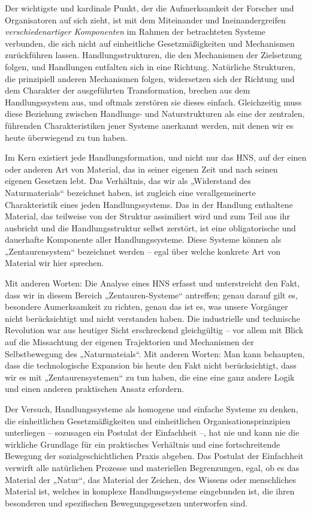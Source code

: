 \documentclass[11pt,a4paper]{article}
\begin{document}
Der wichtigste und kardinale Punkt, der die Aufmerksamkeit der Forscher und
Organisatoren auf sich zieht, ist mit dem Miteinander und Ineinandergreifen
\emph{verschiedenartiger Komponenten} im Rahmen der betrachteten Systeme
verbunden, die sich nicht auf einheitliche Gesetzmäßigkeiten und Mechanismen
zurückführen lassen. Handlungsstrukturen, die den Mechanismen der Zielsetzung
folgen, und Handlungen entfalten sich in eine Richtung. Natürliche Strukturen,
die prinzipiell anderen Mechanismen folgen, widersetzen sich der Richtung und
dem Charakter der ausgeführten Transformation, brechen aus dem Handlungssystem
aus, und oftmals zerstören sie dieses einfach. Gleichzeitig muss diese
Beziehung zwischen Handlungs- und Naturstrukturen als eine der zentralen,
führenden Charakteristiken jener Systeme anerkannt werden, mit denen wir es
heute überwiegend zu tun haben.

Im Kern existiert jede Handlungsformation, und nicht nur das HNS, auf der
einen oder anderen Art von Material, das in seiner eigenen Zeit und nach
seinen eigenen Gesetzen lebt. Das Verhältnis, das wir als „Widerstand des
Naturmaterials“ bezeichnet haben, ist zugleich eine verallgemeinerte
Charakteristik eines jeden Handlungssystems.  Das in der Handlung enthaltene
Material, das teilweise von der Struktur assimiliert wird und zum Teil aus ihr
ausbricht und die Handlungsstruktur selbst zerstört, ist eine obligatorische
und dauerhafte Komponente aller Handlungssysteme. Diese Systeme können als
„Zentaurensystem“ bezeichnet werden -- egal über welche konkrete Art von
Material wir hier sprechen.

Mit anderen Worten: Die Analyse eines HNS erfasst und unterstreicht den Fakt,
dass wir in diesem Bereich „Zentauren-Systeme“ antreffen; genau darauf gilt es,
besondere Aumerksamkeit zu richten, genau das ist es, was unsere Vorgänger
nicht berücksichtigt und nicht verstanden haben.  Die industrielle und
technische Revolution war aus heutiger Sicht erschreckend gleichgültig -- vor
allem mit Blick auf die Missachtung der eigenen Trajektorien und Mechanismen
der Selbstbewegung des „Naturmateials“.  Mit anderen Worten: Man kann
behaupten, dass die technologische Expansion bis heute den Fakt nicht
berücksichtigt, dass wir es mit „Zentaurensystemen“ zu tun haben, die eine
eine ganz andere Logik und einen anderen praktischen Ansatz erfordern.

Der Versuch, Handlungssysteme als homogene und einfache Systeme zu denken, die
einheitlichen Gesetzmäßigkeiten und einheitlichen Organisationsprinzipien
unterliegen -- sozusagen ein Postulat der Einfachheit --, hat nie und kann nie
die wirkliche Grundlage für ein praktisches Verhältnis und eine
fortschreitende Bewegung der sozialgeschichtlichen Praxis abgeben. Das
Postulat der Einfachheit verwirft alle natürlichen Prozesse und materiellen
Begrenzungen, egal, ob es das Material der „Natur“, das Material der Zeichen,
des Wissens oder menschliches Material ist, welches in komplexe
Handlungssysteme eingebunden ist, die ihren besonderen und spezifischen
Bewegungsgesetzen unterworfen sind.
\end{document}
